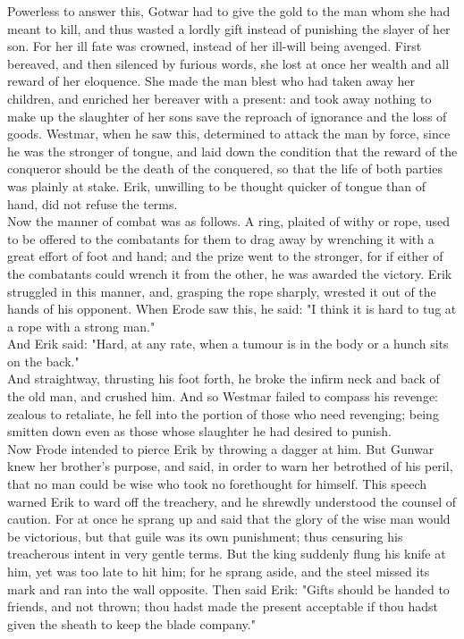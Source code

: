 \documentclass[10pt,a4paper]{report}
\begin{document}
Powerless to answer this, Gotwar had to give the gold to the man whom she had meant to kill, and thus wasted a lordly gift instead of punishing the slayer of her son. For her ill fate was crowned, instead of her ill-will being avenged. First bereaved, and then silenced by furious words, she lost at once her wealth and all reward of her eloquence. She made the man blest who had taken away her children, and enriched her bereaver with a present: and took away nothing to make up the slaughter of her sons save the reproach of ignorance and the loss of goods. Westmar, when he saw this, determined to attack the man by force, since he was the stronger of tongue, and laid down the condition that the reward of the conqueror should be the death of the conquered, so that the life of both parties was plainly at stake. Erik, unwilling to be thought quicker of tongue than of hand, did not refuse the terms.\\

Now the manner of combat was as follows. A ring, plaited of withy or rope, used to be offered to the combatants for them to drag away by wrenching it with a great effort of foot and hand; and the prize went to the stronger, for if either of the combatants could wrench it from the other, he was awarded the victory. Erik struggled in this manner, and, grasping the rope sharply, wrested it out of the hands of his opponent. When Erode saw this, he said: "I think it is hard to tug at a rope with a strong man."\\

And Erik said: "Hard, at any rate, when a tumour is in the body or a hunch sits on the back."\\

And straightway, thrusting his foot forth, he broke the infirm neck and back of the old man, and crushed him. And so Westmar failed to compass his revenge: zealous to retaliate, he fell into the portion of those who need revenging; being smitten down even as those whose slaughter he had desired to punish.\\

Now Frode intended to pierce Erik by throwing a dagger at him. But Gunwar knew her brother's purpose, and said, in order to warn her betrothed of his peril, that no man could be wise who took no forethought for himself. This speech warned Erik to ward off the treachery, and he shrewdly understood the counsel of caution. For at once he sprang up and said that the glory of the wise man would be victorious, but that guile was its own punishment; thus censuring his treacherous intent in very gentle terms. But the king suddenly flung his knife at him, yet was too late to hit him; for he sprang aside, and the steel missed its mark and ran into the wall opposite. Then said Erik: "Gifts should be handed to friends, and not thrown; thou hadst made the present acceptable if thou hadst given the sheath to keep the blade company."\\
\end{document}
